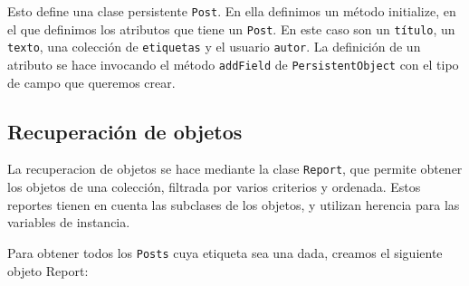 \begin{lgrind}

\end{lgrind}


Esto define una clase persistente \verb"Post". En ella definimos un método initialize, en el que definimos los atributos que tiene un \verb"Post". En este caso son un \verb"título", un \verb"texto", una colección de \verb"etiquetas" y el usuario \verb"autor". La definición de un atributo se hace invocando el método \verb"addField" de \verb"PersistentObject" con el tipo de campo que queremos crear.

\subsection{Recuperación de objetos}
La recuperacion de objetos se hace mediante la clase \verb"Report", que permite obtener los objetos de una colección, filtrada por varios criterios y ordenada. Estos reportes tienen en cuenta las subclases de los objetos, y utilizan herencia para las variables de instancia.

Para obtener todos los \verb"Posts" cuya etiqueta sea una dada, creamos el siguiente objeto Report:

\begin{lgrind}

\end{lgrind}

